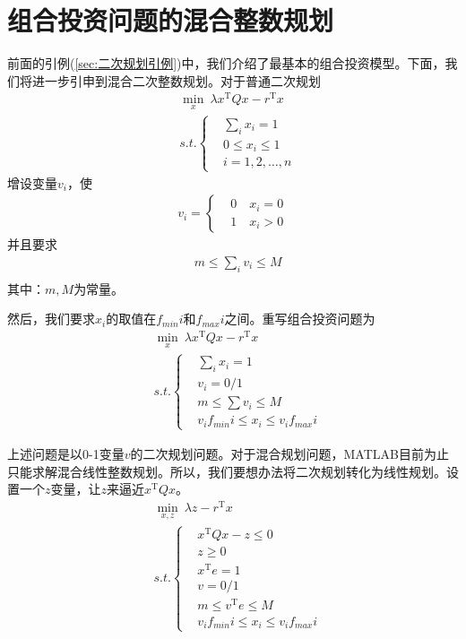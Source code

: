 \section{组合投资问题的混合整数规划}
    \par
    前面的引例(\ref{sec:二次规划引例})中，我们介绍了最基本的组合投资模型。下面，我们将进一步引申到混合二次整数规划。对于普通二次规划
    \begin{align*}
    &\mathop {\min}\limits_x \  \lambda x^\mathrm{T} Qx-r^\mathrm{T} x\\
    &s.t.\left\{
    \begin{aligned}
    &\sum\limits_i x_i=1\\
    &0 \leqslant x_i\leqslant 1\\
    &i=1,2,\ldots,n
    \end{aligned}
  \right.
    \end{align*}
    增设变量$v_i$，使
    \begin{align*}
    v_i=\left\{
    \begin{aligned}
    & 0 \quad x_i= 0\\
    & 1 \quad x_i> 0
    \end{aligned}
    \right.
    \end{align*}
    并且要求
    \begin{align*}
    &m \leqslant \mathop {\sum}\limits_i v_i \leqslant M\\
    \end{align*}
    其中：$m,M$为常量。
    \par
    然后，我们要求$x_i$的取值在$f_{min}i$和$f_{max}i$之间。重写组合投资问题为
    \begin{align*}
    &\mathop {\min}\limits_x\ \lambda x^\mathrm{T} Qx-r^\mathrm{T} x\\
    &s.t.\left\{
    \begin{aligned}
    &\mathop {\sum}\limits_i x_i=1\\
    &v_i=0/1\\
    &m \leqslant \mathop {\sum} v_i \leqslant M\\
    &v_if_{min}i \leqslant x_i \leqslant v_if_{max}i
    \end{aligned}
    \right.
    \end{align*}
    \par
    上述问题是以0-1变量$v$的二次规划问题。对于混合规划问题，MATLAB目前为止只能求解混合线性整数规划。所以，我们要想办法将二次规划转化为线性规划。设置一个$z$变量，让$z$来逼近$x^\mathrm{T} Qx$。
    \begin{align*}
    &\mathop {\min}\limits_{x,z} \ \lambda z-r^\mathrm{T} x\\
    &s.t.\left\{
    \begin{aligned}
    &x^\mathrm{T} Qx-z \leqslant 0\\
    &z \geqslant 0\\
    &x^\mathrm{T} e=1\\
    &v=0/1\\
    &m\leqslant v^\mathrm{T} e \leqslant M\\
    &v_if_{min}i \leqslant x_i \leqslant v_if_{max}i
    \end{aligned}
    \right.
    \end{align*}
